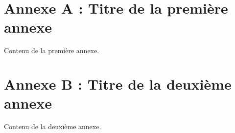 \appendix

\section{Annexe A : Titre de la première annexe}

Contenu de la première annexe.

\section{Annexe B : Titre de la deuxième annexe}

Contenu de la deuxième annexe.

